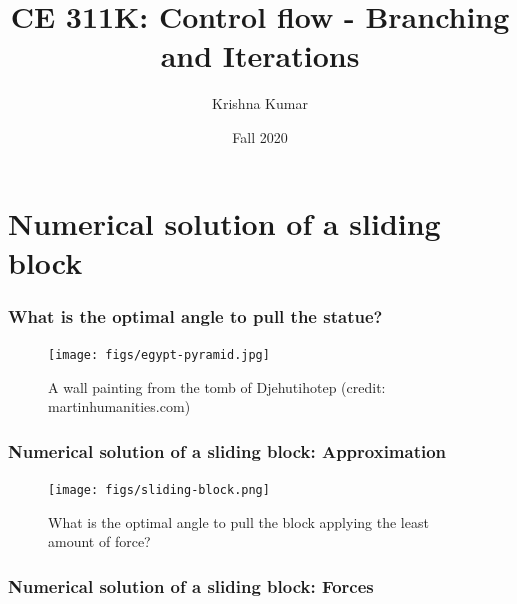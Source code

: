 \documentclass[notes]{beamer}
\title[CE 311K: Control flow]{CE 311K: Control flow - Branching and Iterations}
\author{Krishna Kumar} %
\institute[UT Austin] %
{
University of Texas at Austin \\
\medskip
\href{mailto:krishnak@utexas.edu}{krishnak@utexas.edu} %
}
\date{Fall 2020} %
\begin{document}
\begin{frame}
\titlepage %
\end{frame}

\newif\ifshowtoc
\showtoctrue%

\AtBeginSection{%
	\ifshowtoc
	\begin{frame}
		\tableofcontents[currentsection, subsectionstyle=show/show/hide]
	\end{frame}
	\fi
}


\section{Numerical solution of a sliding block}
\begin{frame}
	\frametitle{What is the optimal angle to pull the statue?}
	\begin{figure}[ht]
		\centering
		\texttt{[image: figs/egypt-pyramid.jpg]}
		\caption*{A wall painting from the tomb of Djehutihotep (credit: martinhumanities.com)}
	\end{figure}
\end{frame}

\begin{frame}
	\frametitle{Numerical solution of a sliding block: Approximation}
	\begin{figure}[ht]
		\centering
		\texttt{[image: figs/sliding-block.png]}
		\caption*{What is the optimal angle to pull the block applying the least amount of force?}
	\end{figure}
\end{frame}


\begin{frame}
	\frametitle{Numerical solution of a sliding block: Forces}
\end{frame}
\end{document}
